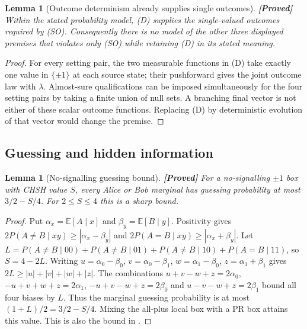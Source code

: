 \documentclass[11pt,a4paper]{article}
\newtheorem{lemma}[theorem]{Lemma}
\theoremstyle{definition}
\theoremstyle{remark}\newtheorem{remark}[theorem]{Remark}
\newcommand{\status}[1]{\textbf{[#1]}\quad}
\newcommand{\E}{\mathbb E}
\begin{document}
\begin{lemma}[Outcome determinism already supplies single outcomes]\label{tet:SOredundant}
\status{Proved}
Within the stated probability model, (D) supplies the single-valued outcomes required by (SO). Consequently there is no model of the other three displayed premises that violates only (SO) while retaining (D) in its stated meaning.
\end{lemma}
\begin{proof}
For every setting pair, the two measurable functions in (D) take exactly one value in $\{\pm1\}$ at each source state; their pushforward gives the joint outcome law with $\lambda$. Almost-sure qualifications can be imposed simultaneously for the four setting pairs by taking a finite union of null sets. A branching final vector is not either of these scalar outcome functions. Replacing (D) by deterministic evolution of that vector would change the premise.
\end{proof}

\subsection{Guessing and hidden information}
\begin{lemma}[No-signalling guessing bound]\label{tet:guess}
\status{Proved}
For a no-signalling $\pm1$ box with CHSH value $S$, every Alice or Bob marginal has guessing probability at most $3/2-S/4$. For $2\le S\le4$ this is a sharp bound.
\end{lemma}
\begin{proof}
Put $\alpha_x=\E[A\mid x]$ and $\beta_y=\E[B\mid y]$. Positivity gives
$2P(A\ne B\mid xy)\ge|\alpha_x-\beta_y|$ and
$2P(A=B\mid xy)\ge|\alpha_x+\beta_y|$.
Let $L=P(A\ne B\mid00)+P(A\ne B\mid01)+P(A\ne B\mid10)+P(A=B\mid11)$, so $S=4-2L$. Writing
$u=\alpha_0-\beta_0$, $v=\alpha_0-\beta_1$,
$w=\alpha_1-\beta_0$, $z=\alpha_1+\beta_1$ gives
$2L\ge|u|+|v|+|w|+|z|$.
The combinations $u+v-w+z=2\alpha_0$,
$-u+v+w+z=2\alpha_1$, $-u+v-w+z=2\beta_0$ and
$u-v-w+z=2\beta_1$ bound all four biases by $L$.
Thus the marginal guessing probability is at most $(1+L)/2=3/2-S/4$.
Mixing the all-plus local box with a PR box attains this value. This is also the bound in \cite[Eq.~(14)]{Pironio10}.
\end{proof}
\end{document}
